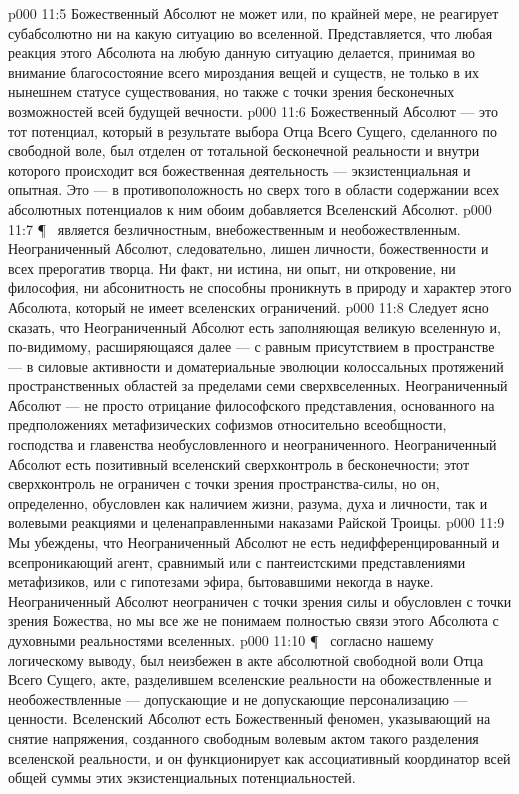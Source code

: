 \vs p000 11:5 Божественный Абсолют не может или, по крайней мере, не реагирует субабсолютно ни на какую ситуацию во вселенной. Представляется, что любая реакция этого Абсолюта на любую данную ситуацию делается, принимая во внимание благосостояние всего мироздания вещей и существ, не только в их нынешнем статусе существования, но также с точки зрения бесконечных возможностей всей будущей вечности.
\vs p000 11:6 Божественный Абсолют --- это тот потенциал, который в результате выбора Отца Всего Сущего, сделанного по свободной воле, был отделен от тотальной бесконечной реальности и внутри которого происходит вся божественная деятельность --- экзистенциальная и опытная. Это ---  в противоположность  но сверх того в области содержании всех абсолютных потенциалов к ним обоим добавляется Вселенский Абсолют.
\vs p000 11:7 \P\ \bibnobreakspace {} является безличностным, внебожественным и необожествленным. Неограниченный Абсолют, следовательно, лишен личности, божественности и всех прерогатив творца. Ни факт, ни истина, ни опыт, ни откровение, ни философия, ни абсонитность не способны проникнуть в природу и характер этого Абсолюта, который не имеет вселенских ограничений.
\vs p000 11:8 Следует ясно сказать, что Неограниченный Абсолют есть  заполняющая великую вселенную и, по\hyp{}видимому, расширяющаяся далее --- с равным присутствием в пространстве --- в силовые активности и доматериальные эволюции колоссальных протяжений пространственных областей за пределами семи сверхвселенных. Неограниченный Абсолют --- не просто отрицание философского представления, основанного на предположениях метафизических софизмов относительно всеобщности, господства и главенства необусловленного и неограниченного. Неограниченный Абсолют есть позитивный вселенский сверхконтроль в бесконечности; этот сверхконтроль не ограничен с точки зрения пространства\hyp{}силы, но он, определенно, обусловлен как наличием жизни, разума, духа и личности, так и волевыми реакциями и целенаправленными наказами Райской Троицы.
\vs p000 11:9 Мы убеждены, что Неограниченный Абсолют не есть недифференцированный и всепроникающий агент, сравнимый или с пантеистскими представлениями метафизиков, или с гипотезами эфира, бытовавшими некогда в науке. Неограниченный Абсолют неограничен с точки зрения силы и обусловлен с точки зрения Божества, но мы все же не понимаем полностью связи этого Абсолюта с духовными реальностями вселенных.
\vs p000 11:10 \P\ \bibnobreakspace {} согласно нашему логическому выводу, был неизбежен в акте абсолютной свободной воли Отца Всего Сущего, акте, разделившем вселенские реальности на обожествленные и необожествленные --- допускающие и не допускающие персонализацию --- ценности. Вселенский Абсолют есть Божественный феномен, указывающий на снятие напряжения, созданного свободным волевым актом такого разделения вселенской реальности, и он функционирует как ассоциативный координатор всей общей суммы этих экзистенциальных потенциальностей.
